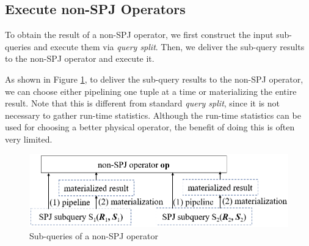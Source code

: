 \subsection{Execute non-SPJ Operators} \label{S62}
    To obtain the result of a non-SPJ operator, we first construct the input sub-queries and execute them via \textit{query split}. Then, we deliver the sub-query results to the non-SPJ operator and execute it.\par
    As shown in Figure \ref{F14}, to deliver the sub-query results to the non-SPJ operator, we can choose either pipelining one tuple at a time or materializing the entire result. Note that this is different from standard \textit{query split}, since it is not necessary to gather run-time statistics. Although the run-time statistics can be used for choosing a better physical operator, the benefit of doing this is often very limited.
    \begin{figure}[htb]
        \centering
        \includegraphics[width=\linewidth]{./pic/Figure14.png}
        \caption{Sub-queries of a non-SPJ operator}
        \label{F14}
        \Description{}
    \end{figure}
